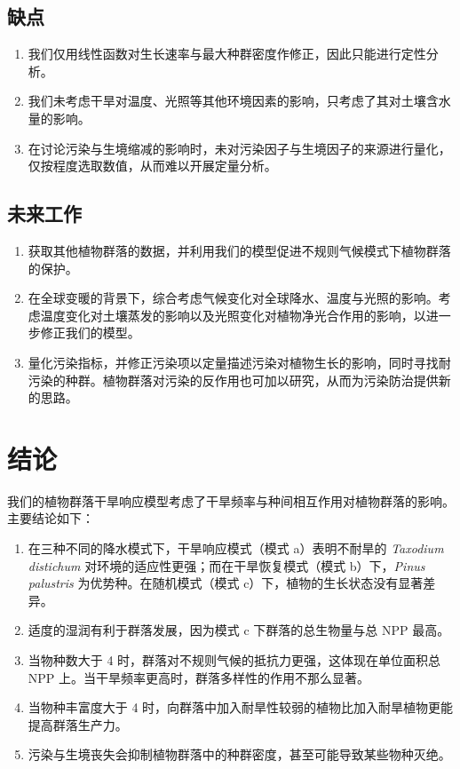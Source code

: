 \documentclass[11pt,a4paper]{ctexart}
\begin{document}
\subsection{缺点}

\begin{enumerate}
\item 我们仅用线性函数对生长速率与最大种群密度作修正，因此只能进行定性分析。
\item 我们未考虑干旱对温度、光照等其他环境因素的影响，只考虑了其对土壤含水量的影响。
\item 在讨论污染与生境缩减的影响时，未对污染因子与生境因子的来源进行量化，仅按程度选取数值，从而难以开展定量分析。
\end{enumerate}

\subsection{未来工作}

\begin{enumerate}
\item 获取其他植物群落的数据，并利用我们的模型促进不规则气候模式下植物群落的保护。
\item 在全球变暖的背景下，综合考虑气候变化对全球降水、温度与光照的影响。考虑温度变化对土壤蒸发的影响以及光照变化对植物净光合作用的影响，以进一步修正我们的模型。
\item 量化污染指标，并修正污染项以定量描述污染对植物生长的影响，同时寻找耐污染的种群。植物群落对污染的反作用也可加以研究，从而为污染防治提供新的思路。
\end{enumerate}

\section{结论}

我们的植物群落干旱响应模型考虑了干旱频率与种间相互作用对植物群落的影响。主要结论如下：

\begin{enumerate}
\item 在三种不同的降水模式下，干旱响应模式（模式 a）表明不耐旱的 \textit{Taxodium distichum} 对环境的适应性更强；而在干旱恢复模式（模式 b）下，\textit{Pinus palustris} 为优势种。在随机模式（模式 c）下，植物的生长状态没有显著差异。
\item 适度的湿润有利于群落发展，因为模式 c 下群落的总生物量与总 NPP 最高。
\item 当物种数大于 4 时，群落对不规则气候的抵抗力更强，这体现在单位面积总 NPP 上。当干旱频率更高时，群落多样性的作用不那么显著。
\item 当物种丰富度大于 4 时，向群落中加入耐旱性较弱的植物比加入耐旱植物更能提高群落生产力。
\item 污染与生境丧失会抑制植物群落中的种群密度，甚至可能导致某些物种灭绝。
\end{enumerate}
\end{document}
